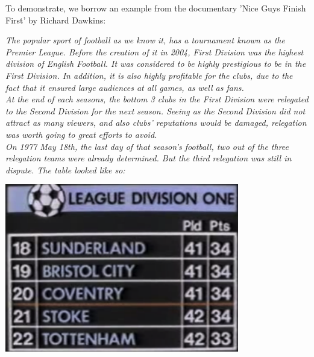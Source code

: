 \documentclass{icldt}
\numberwithin{equation}{section}       %
\begin{document}
To demonstrate, we borrow an example from the documentary 'Nice Guys Finish First' by Richard Dawkins:
\\
\begin{center}
\parbox[c]{12cm}{\emph{The popular sport of football as we know it, has a tournament known as the Premier League. Before the creation of it in 2004, First Division was the highest division of English Football. It was considered to be highly prestigious to be in the First Division. In addition, it is also highly profitable for the clubs, due to the fact that it ensured large audiences at all games, as well as fans.\\
At the end of each seasons, the bottom 3 clubs in the First Division were relegated to the Second Division for the next season. Seeing as the Second Division did not attract as many viewers, and also clubs' reputations would be damaged, relegation was worth going to great efforts to avoid. \\
On 1977 May 18th, the last day of that season's football, two out of the three relegation teams were already determined. But the third relegation was still in dispute. The table looked like so:\\}}
\includegraphics[scale=.75]{leaguetable.png}


\end{center}
\end{document}

